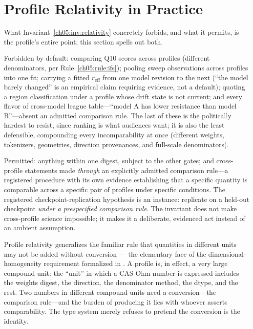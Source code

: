 \section{Profile Relativity in Practice}\label{ch05:relativity}

What Invariant~\ref{ch05:inv:relativity} concretely forbids, and what it
permits, is the profile's entire point; this section spells out both.

Forbidden by default: comparing Q10 scores across profiles (different
denominators, per Rule~\ref{ch05:rule:ifs}); pooling sweep observations
across profiles into one fit; carrying a fitted $r_{\mathrm{eff}}$ from one
model revision to the next (``the model barely changed'' is an empirical
claim requiring evidence, not a default); quoting a region classification
under a profile whose drift state is not current; and every flavor of
cross-model league table---``model A has lower resistance than model
B''---absent an admitted comparison rule. The last of these is the
politically hardest to resist, since ranking is what audiences want; it is
also the least defensible, compounding every incomparability at once
(different weights, tokenizers, geometries, direction provenances, and
full-scale denominators).

Permitted: anything within one digest, subject to the other gates; and
cross-profile statements made \emph{through} an explicitly admitted
comparison rule---a registered procedure with its own evidence establishing
that a specific quantity is comparable across a specific pair of profiles
under specific conditions. The registered checkpoint-replication hypothesis
is an instance: replicate on a held-out checkpoint \emph{under a
prespecified comparison rule}. The invariant does not make cross-profile
science impossible; it makes it a deliberate, evidenced act instead of an
ambient assumption.

\begin{remark}\label{ch05:rem:units-analogy}
Profile relativity generalizes the familiar rule that quantities in
different units may not be added without conversion --- the elementary face
of the dimensional-homogeneity requirement formalized in \cite{buckingham}. A
profile is, in effect, a very large compound unit: the ``unit'' in which a
CAS-Ohm number is expressed includes the weights digest, the direction, the
denominator method, the dtype, and the rest. Two numbers in different
compound units need a conversion---the comparison rule---and the burden of
producing it lies with whoever asserts comparability. The type system merely
refuses to pretend the conversion is the identity.
\end{remark}

